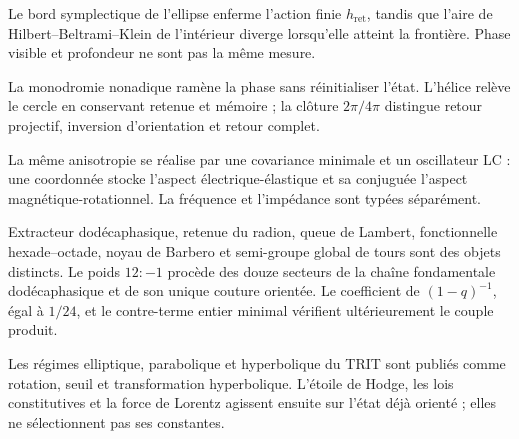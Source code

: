 \begin{exactbox}[title={Finitude symplectique du bord et divergence de l'aire hyperbolique intérieure}]
Le bord symplectique de l'ellipse enferme l'action finie
\(h_{\mathrm{ret}}\), tandis que l'aire de Hilbert--Beltrami--Klein de l'intérieur
diverge lorsqu'elle atteint la frontière. Phase visible et profondeur ne sont pas la même
mesure.
\end{exactbox}

\begin{exactbox}[title={Relèvement hélicoïdal nonadique avec retour de phase et avance de mémoire}]
La monodromie nonadique ramène la phase sans réinitialiser l'état. L'hélice
relève le cercle en conservant retenue et mémoire ; la clôture \(2\pi/4\pi\)
distingue retour projectif, inversion d'orientation et retour complet.
\end{exactbox}

\begin{narrativebox}[title={Réalisation oscillatoire et constitutive électromagnétique}]
La même anisotropie se réalise par une covariance minimale et un oscillateur
LC : une coordonnée stocke l'aspect électrique-élastique et sa conjuguée
l'aspect magnétique-rotationnel. La fréquence et l'impédance sont typées
séparément.
\end{narrativebox}

\begin{exactbox}[title={Séparation typée des opérateurs \(90/120\)}]
Extracteur dodécaphasique, retenue du radion, queue de Lambert, fonctionnelle
hexade--octade, noyau de Barbero et semi-groupe global de tours sont des objets
distincts. Le poids \(12:-1\) procède des douze secteurs de la chaîne
fondamentale dodécaphasique et de son unique couture orientée. Le coefficient de
\((1-q)^{-1}\), égal à \(1/24\), et le contre-terme entier minimal vérifient
ultérieurement le couple produit.
\end{exactbox}

\begin{narrativebox}[title={Réalisations complexe, lorentzienne et duale de Hodge}]
Les régimes elliptique, parabolique et hyperbolique du TRIT sont publiés comme
rotation, seuil et transformation hyperbolique. L'étoile de Hodge, les lois constitutives et la force
de Lorentz agissent ensuite sur l'état déjà orienté ; elles ne sélectionnent pas ses
constantes.
\end{narrativebox}

